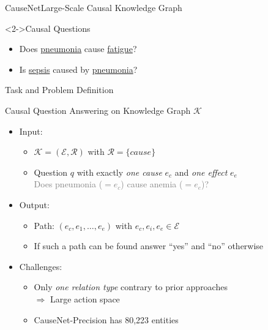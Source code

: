 \documentclass[table]{beamer}
\begin{document}
\begin{frame}{CauseNet}{Large-Scale Causal Knowledge Graph}
\begin{textblock*}{5cm}
{}
\end{textblock*}

	\begin{exampleblock}<2->{Causal Questions}
	\begin{itemize}
	  \item Does \underline{pneumonia} cause \underline{fatigue}?
	  \item Is \underline{sepsis} caused by \underline{pneumonia}?
	\end{itemize}
\end{exampleblock}

\end{frame}

\begin{frame}{Task and Problem Definition}
	\begin{block}{Causal Question Answering on Knowledge Graph $\mathcal{K}$}
    \begin{itemize}
	\item Input:
	\begin{itemize}
	  \item $\mathcal{K}=(\mathcal{E}, \mathcal{R})$ with $\mathcal{R} = \{cause\}$
    \item Question $q$ with exactly \emph{one cause} $e_c$ and \emph{one effect} $e_e$\\
    \textcolor{gray}{Does pneumonia ($= e_c$) cause anemia ($ = e_e$)?}
	\end{itemize}
	\item<2-> Output:
	\begin{itemize}
	    \item Path: $(e_c, e_1, \dots, e_e)$ with $e_c, e_i, e_e \in \mathcal{E}$
      \item If such a path can be found answer ``yes'' and ``no'' otherwise
    \end{itemize}
	\item<3-> Challenges:
	\begin{itemize}
	    \item Only \emph{one relation type} contrary to prior approaches\\$\Rightarrow$ Large action space
	    \item CauseNet-Precision has 80,223 entities
    \end{itemize}
  \end{itemize}
\end{block}
\end{frame}
\end{document}
